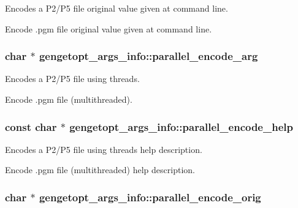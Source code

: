 Encodes a P2/\+P5 file original value given at command line. 

Encode .pgm file original value given at command line. \hypertarget{structgengetopt__args__info_ad1f8b6acc1b4b6a6390fcc35eaf3694d}{}
\subsubsection[{parallel\+\_\+encode\+\_\+arg}]{\setlength{\rightskip}{0pt plus 5cm}char $\ast$ gengetopt\+\_\+args\+\_\+info\+::parallel\+\_\+encode\+\_\+arg}\label{structgengetopt__args__info_ad1f8b6acc1b4b6a6390fcc35eaf3694d}


Encodes a P2/\+P5 file using threads. 

Encode .pgm file (multithreaded). \hypertarget{structgengetopt__args__info_a8518c070a081f81d1092578f53459751}{}
\subsubsection[{parallel\+\_\+encode\+\_\+help}]{\setlength{\rightskip}{0pt plus 5cm}const char $\ast$ gengetopt\+\_\+args\+\_\+info\+::parallel\+\_\+encode\+\_\+help}\label{structgengetopt__args__info_a8518c070a081f81d1092578f53459751}


Encodes a P2/\+P5 file using threads help description. 

Encode .pgm file (multithreaded) help description. \hypertarget{structgengetopt__args__info_aed4928a51c33857c16e2ea0a4fa2ca2a}{}
\subsubsection[{parallel\+\_\+encode\+\_\+orig}]{\setlength{\rightskip}{0pt plus 5cm}char $\ast$ gengetopt\+\_\+args\+\_\+info\+::parallel\+\_\+encode\+\_\+orig}\label{structgengetopt__args__info_aed4928a51c33857c16e2ea0a4fa2ca2a}


